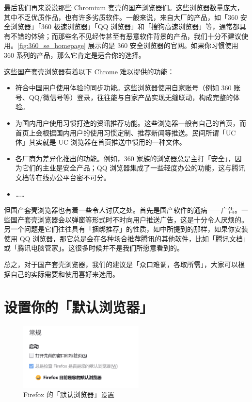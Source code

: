 最后我们再来说说那些 Chromium 套壳的国产浏览器们。这些浏览器数量庞大，其中不乏优质作品，也有许多劣质软件。一般来说，来自大厂的产品，如「360 安全浏览器」「360 极速浏览器」「QQ 浏览器」和「搜狗高速浏览器」等，通常都具有不错的体验；而那些名不见经传甚至有恶意软件背景的产品，我们十分不建议使用。\autoref{fig:360_se_homepage} 展示的是 360 安全浏览器的官网。如果你习惯使用 360 系列的产品，那么它肯定是适合你的选择。

这些国产套壳浏览器有着以下 Chrome 难以提供的功能：

\begin{itemize}
  \item 符合中国用户使用体验的同步功能。这些浏览器使用自家账号（例如 360 账号、QQ/微信号等）登录，往往能与自家产品实现无缝联动，构成完整的体验。
  \item 为国内用户使用习惯打造的资讯推荐功能。这些浏览器一般有自己的首页，而首页上会根据国内用户的使用习惯定制、推荐新闻等推送。民间所谓「UC 体」其实就是 UC 浏览器在首页推送中惯用的一种文体。
  \item 各厂商为差异化推出的功能。例如，360 家族的浏览器总是主打「安全」，因为它们的主业是安全产品；QQ 浏览器集成了一些轻度办公的功能，这与腾讯文档等在线办公平台密不可分。
  \item ……
\end{itemize}

但国产套壳浏览器也有着一些令人讨厌之处。首先是国产软件的通病——广告。一些国产套壳浏览器会以弹窗等形式时不时向用户推送广告，这是十分令人厌烦的。另一个问题是它们往往具有「捆绑推荐」的性质，如中所提到的那样，如果你安装使用 QQ 浏览器，那它总是会在各种场合推荐腾讯的其他软件，比如「腾讯文档」或「腾讯电脑管家」。这很多时候并不是我们所愿意看到的。

总之，对于国产套壳浏览器，我们的建议是「众口难调，各取所需」，大家可以根据自己的实际需要和使用喜好来选用。

\section{设置你的「默认浏览器」}

\begin{figure}
  \centering
  \vspace*{-.4cm}
  \includegraphics[width=6.3cm]{assets/software/Firefox_default_browser.png}
  \caption{Firefox 的「默认浏览器」设置}
  \label{fig:Firefox_default_browser}
\end{figure}

